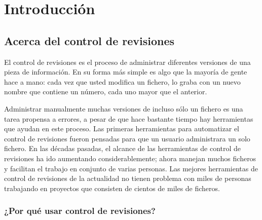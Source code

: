 \chapter{Introducción}
\label{chap:intro}

\section{Acerca del control de revisiones}

El control de revisiones es el proceso de administrar diferentes
versiones de una pieza de información. En su forma más simple es algo
que la mayoría de gente hace a mano: cada vez que usted modifica un
fichero, lo graba con un nuevo nombre que contiene un número, cada uno
mayor que el anterior.

Administrar manualmente muchas versiones de incluso sólo un fichero es una tarea
propensa a errores, a pesar de que hace bastante tiempo hay
herramientas que ayudan en este proceso.  Las primeras herramientas
para automatizar el control de revisiones fueron pensadas para que un
usuario administrara un solo fichero.  En las décadas pasadas, el
alcance de las herramientas de control de revisiones ha ido aumentando
considerablemente; ahora manejan muchos ficheros y facilitan el
trabajo en conjunto de varias personas. Las mejores herramientas de
control de revisiones de la actualidad no tienen problema con miles de
personas trabajando en proyectos que consisten de cientos de miles de
ficheros.

\subsection{¿Por qué usar control de revisiones?}

